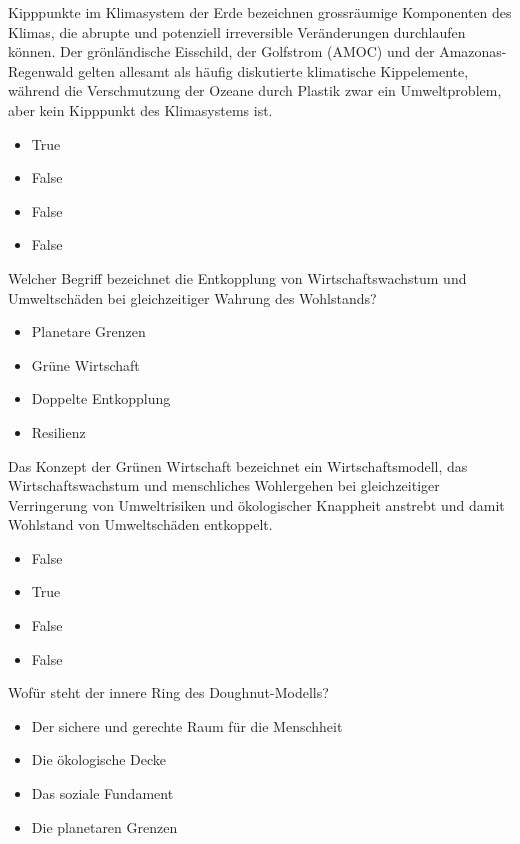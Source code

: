 \documentclass[
  nswissgerman,
  a4paper,
  DIV=11,
  numbers=noendperiod,
  oneside,
  openany]{scrreprt}
\providecommand{\tightlist}{%
  \setlength{\itemsep}{0pt}\setlength{\parskip}{0pt}}
\begin{document}
Kipppunkte im Klimasystem der Erde bezeichnen grossräumige Komponenten
des Klimas, die abrupte und potenziell irreversible Veränderungen
durchlaufen können. Der grönländische Eisschild, der Golfstrom (AMOC)
und der Amazonas-Regenwald gelten allesamt als häufig diskutierte
klimatische Kippelemente, während die Verschmutzung der Ozeane durch
Plastik zwar ein Umweltproblem, aber kein Kipppunkt des Klimasystems
ist.

\begin{itemize}
\tightlist
\item
  True
\item
  False
\item
  False
\item
  False
\end{itemize}

Welcher Begriff bezeichnet die Entkopplung von Wirtschaftswachstum und
Umweltschäden bei gleichzeitiger Wahrung des Wohlstands?

\begin{itemize}
\tightlist
\item[$\square$]
  Planetare Grenzen
\item[$\square$]
  Grüne Wirtschaft
\item[$\square$]
  Doppelte Entkopplung
\item[$\square$]
  Resilienz
\end{itemize}

Das Konzept der Grünen Wirtschaft bezeichnet ein Wirtschaftsmodell, das
Wirtschaftswachstum und menschliches Wohlergehen bei gleichzeitiger
Verringerung von Umweltrisiken und ökologischer Knappheit anstrebt und
damit Wohlstand von Umweltschäden entkoppelt.

\begin{itemize}
\tightlist
\item
  False
\item
  True
\item
  False
\item
  False
\end{itemize}

Wofür steht der innere Ring des Doughnut-Modells?

\begin{itemize}
\tightlist
\item[$\square$]
  Der sichere und gerechte Raum für die Menschheit
\item[$\square$]
  Die ökologische Decke
\item[$\square$]
  Das soziale Fundament
\item[$\square$]
  Die planetaren Grenzen
\end{itemize}
\end{document}
